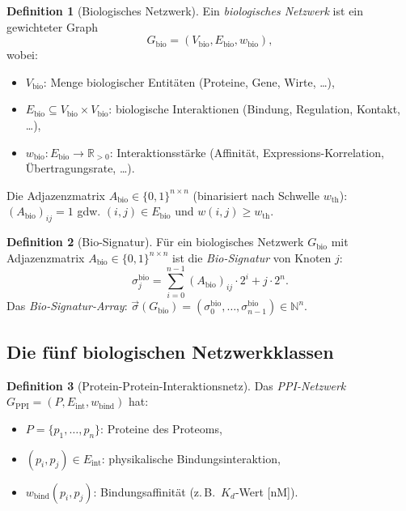 ﻿\documentclass[a4paper,12pt]{article}
\theoremstyle{plain}
\theoremstyle{definition}
\newtheorem{definition}{Definition}
\theoremstyle{remark}
\newcommand{\Gbio}{G_{\mathrm{bio}}}
\newcommand{\Gppi}{G_{\mathrm{PPI}}}
\newcommand{\sigvec}{\vec{\sigma}}
\begin{document}
\begin{definition}[Biologisches Netzwerk]
\label{def:bio_netz}
Ein \emph{biologisches Netzwerk} ist ein gewichteter Graph
\[
\Gbio = (V_{\mathrm{bio}}, E_{\mathrm{bio}}, w_{\mathrm{bio}}),
\]
wobei:
\begin{itemize}
    \item $V_{\mathrm{bio}}$: Menge biologischer Entit\"aten
          (Proteine, Gene, Wirte, \ldots),
    \item $E_{\mathrm{bio}} \subseteq V_{\mathrm{bio}} \times V_{\mathrm{bio}}$:
          biologische Interaktionen (Bindung, Regulation, Kontakt, \ldots),
    \item $w_{\mathrm{bio}}: E_{\mathrm{bio}} \to \mathbb{R}_{>0}$:
          Interaktionsst\"arke (Affinit\"at, Expressions-Korrelation,
          \"Ubertragungsrate, \ldots).
\end{itemize}
Die Adjazenzmatrix $A_{\mathrm{bio}} \in \{0,1\}^{n \times n}$
(binarisiert nach Schwelle $w_{\mathrm{th}}$): $(A_{\mathrm{bio}})_{ij} = 1$
gdw. $(i,j) \in E_{\mathrm{bio}}$ und $w(i,j) \geq w_{\mathrm{th}}$.
\end{definition}

\begin{definition}[Bio-Signatur]
\label{def:bio_sig}
F\"ur ein biologisches Netzwerk $\Gbio$ mit Adjazenzmatrix
$A_{\mathrm{bio}} \in \{0,1\}^{n \times n}$ ist die
\emph{Bio-Signatur} von Knoten $j$:
\[
\sigma_j^{\mathrm{bio}} = \sum_{i=0}^{n-1} (A_{\mathrm{bio}})_{ij} \cdot 2^i
+ j \cdot 2^n.
\]
Das \emph{Bio-Signatur-Array}: $\sigvec(\Gbio) = (\sigma_0^{\mathrm{bio}},
\ldots, \sigma_{n-1}^{\mathrm{bio}}) \in \mathbb{N}^n$.
\end{definition}

\subsection{Die f\"unf biologischen Netzwerkklassen}

\begin{definition}[Protein-Protein-Interaktionsnetz]
\label{def:ppi}
Das \emph{PPI-Netzwerk} $\Gppi = (P, E_{\mathrm{int}}, w_{\mathrm{bind}})$
hat:
\begin{itemize}
    \item $P = \{p_1, \ldots, p_n\}$: Proteine des Proteoms,
    \item $(p_i, p_j) \in E_{\mathrm{int}}$: physikalische Bindungsinteraktion,
    \item $w_{\mathrm{bind}}(p_i, p_j)$: Bindungsaffinit\"at
          (z.\,B.\ $K_d$-Wert [nM]).
\end{itemize}
\end{definition}
\end{document}
